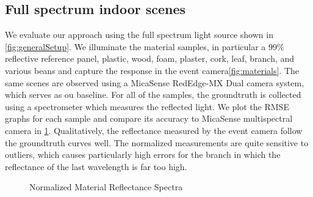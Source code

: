 \subsection{Full spectrum indoor scenes}
\label{sec:fullspectrum}

We evaluate our approach using the full spectrum light source shown in \Fig \ref{fig:generalSetup}.
We illuminate the material samples, in particular a 99\% reflective reference panel, plastic, wood, foam, plaster, cork, leaf, branch, and various beans and capture the response in the event camera\Fig \ref{fig:materials}.
The same scenes are observed  using a MicaSense RedEdge-MX Dual camera system, which serves as ou baseline.
For all of the samples, the groundtruth is collected using a spectrometer which measures the reflected light.
We plot the RMSE graphs for each sample and compare its accuracy to MicaSense multispectral camera \cite{} in \Fig \ref{fig:materialResponses}.
Qualitatively, the reflectance measured by the event camera follow the groundtruth curves well.
The normalized measurements are quite sensitive to outliers, which causes particularly high errors for the branch in which the reflectance of the last wavelength is far too high.


\begin{figure}
\centering
{}
\caption{Normalized Material Reflectance Spectra }
\label{fig:materialResponses}
\end{figure}

